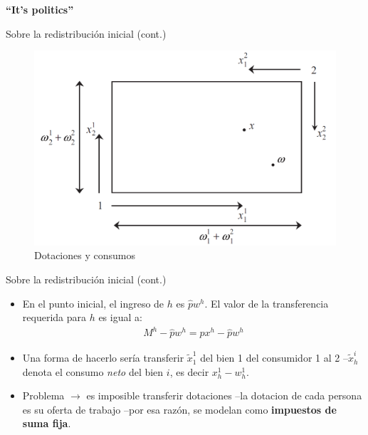 \documentclass[
  ignorenonframetext,
]{beamer}
\providecommand{\tightlist}{%
  \setlength{\itemsep}{0pt}\setlength{\parskip}{0pt}}\usepackage{longtable,booktabs,array}
\begin{document}
\begin{frame}{\textbf{``It's politics''}}
\begin{block}{Sobre la redistribución inicial (cont.)}
\protect\hypertarget{sobre-la-redistribuciuxf3n-inicial-cont.-1}{}
\begin{figure}

{\centering \includegraphics{../epol/fig/fig-01-010.png}

}

\caption{Dotaciones y consumos}

\end{figure}
\end{block}

\begin{block}{Sobre la redistribución inicial (cont.)}
\protect\hypertarget{sobre-la-redistribuciuxf3n-inicial-cont.-2}{}
\begin{itemize}
\tightlist
\item
  En el punto inicial, el ingreso de \(h\) es \(\hat{p}w^{h}\). El valor
  de la transferencia requerida para \(h\) es igual a: \[\begin{aligned}
  M^{h}-\hat{p}w^{h}=\hat{p}x^{h}-\hat{p}w^{h}
  \end{aligned}\]
\item
  Una forma de hacerlo sería transferir \(\tilde{x}_{1}^{1}\) del bien 1
  del consumidor 1 al 2 --\(\tilde{x}_{h}^{i}\) denota el consumo
  \emph{neto} del bien \(i\), es decir \(x_{h}^{1}-w_{h}^{1}\).\\
\item
  Problema \(\longrightarrow\) es imposible transferir dotaciones --la
  dotacion de cada persona es su oferta de trabajo --por esa razón, se
  modelan como \textbf{impuestos de suma fija}.
\end{itemize}
\end{block}


\end{frame}
\end{document}
